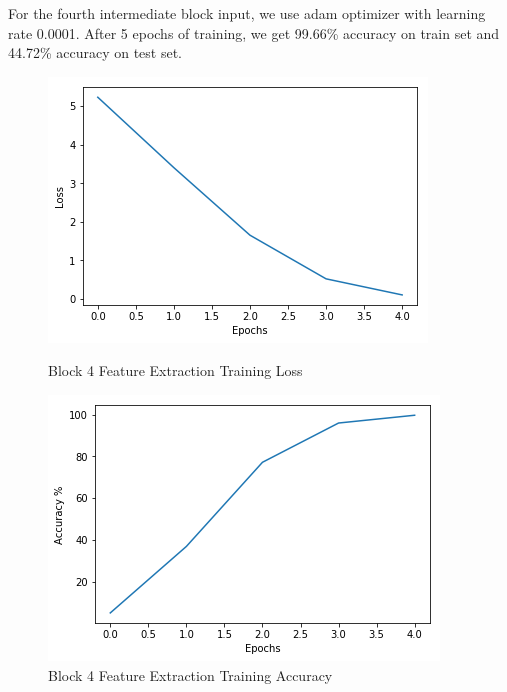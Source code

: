 \documentclass{article}
\begin{document}
For the fourth intermediate block input, we use adam optimizer with learning rate 0.0001. After 5 epochs of training, we get 99.66\% accuracy on train set and 44.72\% accuracy on test set.

\begin{figure}[h!]
	\begin{minipage}{0.48\textwidth}
		\centering
		\includegraphics[width=\textwidth]{pics/fe_block4_loss.png}
		\caption{Block 4 Feature Extraction Training Loss}
	\end{minipage}
	\hfill
	\begin{minipage}{0.48\textwidth}
		\centering
		\includegraphics[width=\textwidth]{pics/fe_block4_acc.png}
		\caption{Block 4 Feature Extraction Training Accuracy}
	\end{minipage}
\end{figure}
\end{document}
